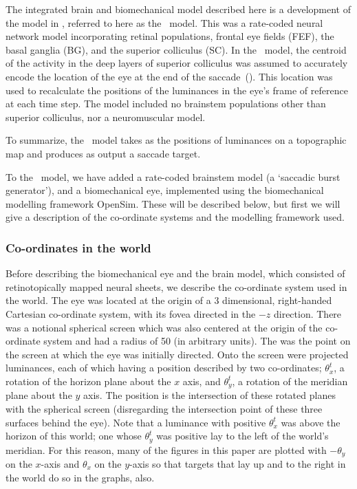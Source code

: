 \documentclass{frontiersSCNS}
\begin{document}
The integrated brain and biomechanical model described here is a
development of the model in \cite{cope_basal_2017},
referred to here as the \ccg~model. This was a rate-coded neural
network model incorporating retinal populations, frontal eye fields
(FEF), the basal ganglia (BG), and the superior colliculus (SC). In
the \ccg~model, the centroid of the activity in the deep
layers of superior colliculus was assumed to accurately encode the
location of the eye at the end of the
saccade~(\cite{wurtz_activity_1972,robinson_eye_1972,van_gisbergen_collicular_1987,mcilwain_lateral_1982}).
This location was used to recalculate the positions of the luminances in
the eye's frame of reference at each time step. The model included no
brainstem populations other than superior colliculus, nor a
neuromuscular model.

To summarize, the \ccg~model takes as  the positions
of luminances on a topographic map and produces as output a saccade
target.

To the \ccg~model, we have added a rate-coded brainstem model (a `saccadic
burst generator'), and a biomechanical eye, implemented using the
biomechanical modelling framework OpenSim. These will be described below,
but first we will give a description of the co-ordinate systems and the
modelling framework used.

\subsubsection{Co-ordinates in the world}

Before describing the biomechanical eye and the brain model, which consisted
of retinotopically mapped neural sheets, we describe the co-ordinate system
used in the world. The eye was located at the origin of a 3 dimensional, right-handed
Cartesian co-ordinate system, with its fovea directed in the $-z$ direction.
There was a notional spherical screen which was also centered at the origin of the
co-ordinate system and had a radius of 50 (in arbitrary units). The  was the point on the
screen at which the eye was initially directed.
Onto the screen were projected luminances, each of which having a position
described by two co-ordinates; $\theta_{x}^{t}$, a
rotation of the horizon plane about the $x$ axis, and $\theta_{y}^{t}$, a rotation
of the meridian plane about the $y$ axis. The position is the intersection
of these rotated planes with the spherical screen (disregarding
the intersection point of these three surfaces behind the eye).
%
Note that a luminance with positive $\theta_{x}^{t}$ was above the horizon of this world;
one whose $\theta_{y}^{t}$ was positive lay to the left of the world's meridian. For this
reason, many of the figures in this paper are plotted with $-\theta_{y}$ on the
$x$-axis and $\theta_{x}$ on the $y$-axis so that targets that lay up and to the right
in the world do so in the graphs, also.
\end{document}
